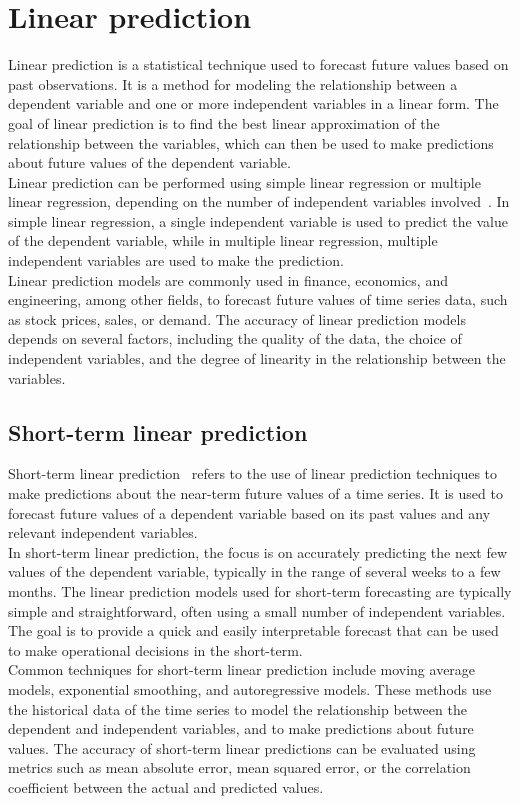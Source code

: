 \section{Linear prediction} \label{sec:lp}
Linear prediction is a statistical technique used to forecast future values based on past observations. It is a method for modeling the
relationship between a dependent variable and one or more independent variables in a linear form. The goal of linear prediction is to find
the best linear approximation of the relationship between the variables, which can then be used to make predictions about future values of
the dependent variable.
\\
Linear prediction can be performed using simple linear regression or multiple linear regression, depending on the number of independent variables
involved~\cite{Parks}. In simple linear regression, a single independent variable is used to predict the value of the dependent variable, while in multiple linear
regression, multiple independent variables are used to make the prediction.
\\
Linear prediction models are commonly used in finance, economics, and engineering, among other fields, to forecast future values of time series data,
such as stock prices, sales, or demand. The accuracy of linear prediction models depends on several factors, including the quality of the data,
the choice of independent variables, and the degree of linearity in the relationship between the variables.

    \subsection{Short-term linear prediction} \label{sec:shortlp}

    Short-term linear prediction~\cite{Riahy} refers to the use of linear prediction techniques to make predictions about the near-term future values of a time series.
    It is used to forecast future values of a dependent variable based on its past values and any relevant independent variables.
    \\
    In short-term linear prediction, the focus is on accurately predicting the next few values of the dependent variable, typically in the range of
    several weeks to a few months. The linear prediction models used for short-term forecasting are typically simple and straightforward, often
    using a small number of independent variables. The goal is to provide a quick and easily interpretable forecast that can be used to make operational
    decisions in the short-term.
    \\
    Common techniques for short-term linear prediction include moving average models, exponential smoothing, and autoregressive models. These methods
    use the historical data of the time series to model the relationship between the dependent and independent variables, and to make predictions
    about future values. The accuracy of short-term linear predictions can be evaluated using metrics such as mean absolute error, mean squared
    error, or the correlation coefficient between the actual and predicted values.

